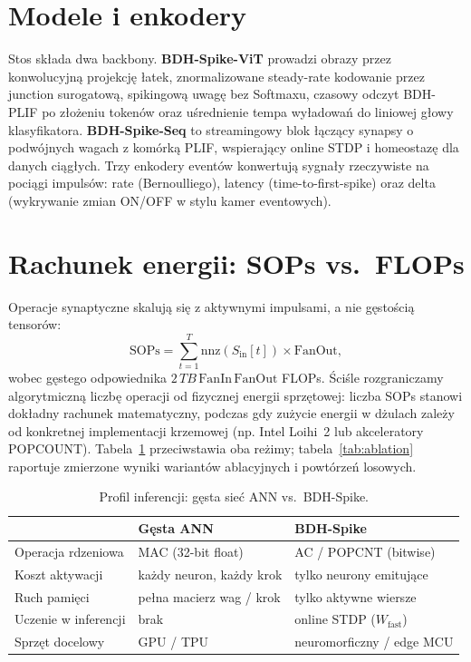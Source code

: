 \documentclass[11pt]{article}
\newcommand{\Wfast}{W_{\text{fast}}}
\begin{document}
\section{Modele i enkodery}
Stos składa dwa backbony. \textbf{BDH-Spike-ViT} prowadzi obrazy przez
konwolucyjną projekcję łatek, znormalizowane steady-rate kodowanie przez
junction surogatową, spikingową uwagę bez Softmaxu, czasowy odczyt BDH-PLIF
po złożeniu tokenów oraz uśrednienie tempa wyładowań do liniowej głowy
klasyfikatora. \textbf{BDH-Spike-Seq} to streamingowy blok łączący synapsy o
podwójnych wagach z komórką PLIF, wspierający online STDP i homeostazę dla
danych ciągłych. Trzy enkodery eventów konwertują sygnały rzeczywiste na
pociągi impulsów: rate (Bernoulliego), latency (time-to-first-spike) oraz
delta (wykrywanie zmian ON/OFF w stylu kamer eventowych).

\section{Rachunek energii: SOPs vs.\ FLOPs}
Operacje synaptyczne skalują się z aktywnymi impulsami, a nie gęstością
tensorów:
\begin{equation}
\text{SOPs} = \sum_{t=1}^{T} \mathrm{nnz}(S_{\text{in}}[t]) \times
\text{FanOut},
\end{equation}
wobec gęstego odpowiednika $2\,T B\,\text{FanIn}\,\text{FanOut}$ FLOPs.
Ściśle rozgraniczamy algorytmiczną liczbę operacji od fizycznej energii sprzętowej:
liczba SOPs stanowi dokładny rachunek matematyczny, podczas gdy zużycie energii
w dżulach zależy od konkretnej implementacji krzemowej (np. Intel Loihi~2 lub akceleratory POPCOUNT).
Tabela~\ref{tab:energy} przeciwstawia oba reżimy; tabela~\ref{tab:ablation}
raportuje zmierzone wyniki wariantów ablacyjnych i powtórzeń losowych.

\begin{table}[h]
\centering
\caption{Profil inferencji: gęsta sieć ANN vs.\ BDH-Spike.}
\label{tab:energy}
\begin{small}
\begin{tabular}{lll}
\toprule
 & Gęsta ANN & BDH-Spike \\
\midrule
Operacja rdzeniowa & MAC (32-bit float) & AC / POPCNT (bitwise) \\
Koszt aktywacji & każdy neuron, każdy krok & tylko neurony emitujące \\
Ruch pamięci & pełna macierz wag / krok & tylko aktywne wiersze \\
Uczenie w inferencji & brak & online STDP ($\Wfast$) \\
Sprzęt docelowy & GPU / TPU & neuromorficzny / edge MCU \\
\bottomrule
\end{tabular}
\end{small}
\end{table}
\end{document}
